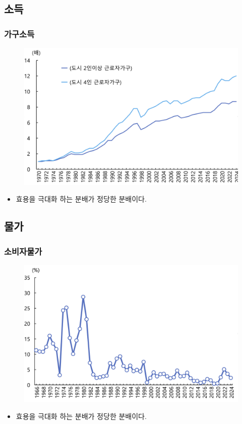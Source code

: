 \documentclass[aspectratio=169,xcolor=dvipsnames,handout]{beamer}
\begin{document}
\subsection{소득}
\begin{frame}[<+->]
\frametitle{가구소득}
    \begin{figure}
        \centering
        \includegraphics[width=.55\textwidth]{pic/fig_ineq_01.png}
    \end{figure}
    \begin{itemize}
        \item 효용을 극대화 하는 분배가 정당한 분배이다.
    \end{itemize}
\end{frame}

\subsection{물가}
\begin{frame}[<+->]
\frametitle{소비자물가}
    \begin{figure}
        \centering
        \includegraphics[width=.55\textwidth]{pic/fig_ineq_02.png}
    \end{figure}
    \begin{itemize}
        \item 효용을 극대화 하는 분배가 정당한 분배이다.
    \end{itemize}
\end{frame}
\end{document}
